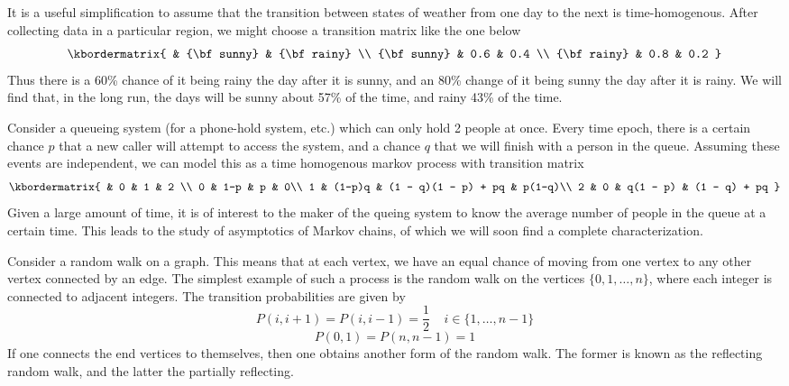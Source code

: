 \begin{example}
    It is a useful simplification to assume that the transition between states of weather from one day to the next is time-homogenous. After collecting data in a particular region, we might choose a transition matrix like the one below
    \[
  \kbordermatrix{
    & {\bf sunny} & {\bf rainy} \\
    {\bf sunny} & 0.6 & 0.4 \\
    {\bf rainy} & 0.8 & 0.2
  }
\]
    Thus there is a 60\% chance of it being rainy the day after it is sunny, and an 80\% change of it being sunny the day after it is rainy. We will find that, in the long run, the days will be sunny about 57\% of the time, and rainy 43\% of the time.
\end{example}

\begin{example}
    Consider a queueing system (for a phone-hold system, etc.) which can only hold 2 people at once. Every time epoch, there is a certain chance $p$ that a new caller will attempt to access the system, and a chance $q$ that we will finish with a person in the queue. Assuming these events are independent, we can model this as a time homogenous markov process with transition matrix
    \[ \kbordermatrix{
    & 0 & 1 & 2 \\
    0 & 1-p & p & 0\\
    1 & (1-p)q & (1 - q)(1 - p) + pq & p(1-q)\\
    2 & 0 & q(1 - p) & (1 - q) + pq }
    \]
    Given a large amount of time, it is of interest to the maker of the queing system to know the average number of people in the queue at a certain time. This leads to the study of asymptotics of Markov chains, of which we will soon find a complete characterization.
\end{example}

\begin{example}
    Consider a random walk on a graph. This means that at each vertex, we have an equal chance of moving from one vertex to any other vertex connected by an edge. The simplest example of such a process is the random walk on the vertices $\{ 0, 1, \dots, n\}$, where each integer is connected to adjacent integers. The transition probabilities are given by
    \[ P(i,i+1) = P(i,i-1) = \frac{1}{2}\ \ \ \ \ i \in \{1, \dots, n-1 \} \]
    \[ P(0,1) = P(n,n-1) = 1 \]
    If one connects the end vertices to themselves, then one obtains another form of the random walk. The former is known as the reflecting random walk, and the latter the partially reflecting.
\end{example}

